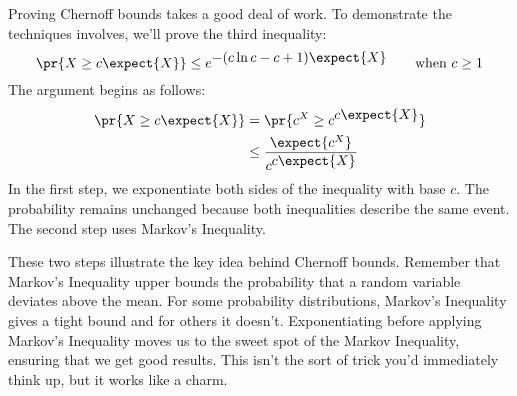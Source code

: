 \begin{editingnotes}
Proving Chernoff bounds takes a good deal of work.  To demonstrate the
techniques involves, we'll prove the third inequality:
%
\[
\pr{X \geq c \expect{X}} \leq e^{\textstyle -(c \ln c - c + 1) \expect{X}}
    \qquad \text{when $c \geq 1$}
\]
%
The argument begins as follows:
%
\begin{align}
\pr{X \geq c \expect{X}}
  & = \pr{c^{X} \geq c^{\textstyle c \expect{X}}} \notag \\
  & \leq \frac{\expect{c^X}}{c^{\textstyle c \expect{X}}} \label{eqn:chernoffbase}
\end{align}
%
In the first step, we exponentiate both sides of the inequality with
base $c$.  The probability remains unchanged because both inequalities
describe the same event.  The second step uses Markov's Inequality.

These two steps illustrate the key idea behind Chernoff bounds.
Remember that Markov's Inequality upper bounds the probability that a
random variable deviates above the mean.  For some probability
distributions, Markov's Inequality gives a tight bound and for others
it doesn't.  Exponentiating before applying Markov's Inequality moves
us to the sweet spot of the Markov Inequality, ensuring that we get
good results.  This isn't the sort of trick you'd immediately think
up, but it works like a charm.


\end{editingnotes}
